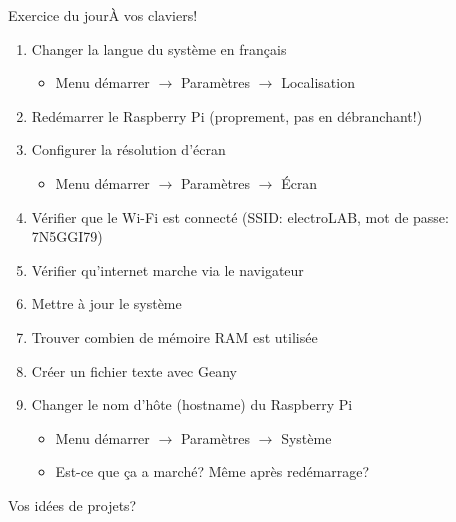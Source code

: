 \documentclass[
aspectratio=169 %
]{beamer}
\begin{document}
\begin{frame}{Exercice du jour}{À vos claviers!}
  \begin{enumerate}
    \item  Changer la langue du système en français
          \begin{itemize}
            \item Menu démarrer \(\rightarrow\) Paramètres \(\rightarrow\)
                  Localisation
          \end{itemize}
    \item Redémarrer le Raspberry Pi (proprement, pas en débranchant!)
    \item Configurer la résolution d'écran
          \begin{itemize}
            \item Menu démarrer \(\rightarrow\) Paramètres \(\rightarrow\)
                  Écran
          \end{itemize}
    \item Vérifier que le Wi-Fi est connecté (SSID: electroLAB, mot de passe:
          7N5GGI79)
    \item Vérifier qu'internet marche via le navigateur
    \item Mettre à jour le système
    \item Trouver combien de mémoire RAM est utilisée
    \item Créer un fichier texte avec Geany
    \item Changer le nom d'hôte (hostname) du Raspberry Pi
          \begin{itemize}
            \item Menu démarrer \(\rightarrow\) Paramètres \(\rightarrow\)
                  Système
            \item Est-ce que ça a marché?
                  Même après redémarrage?
          \end{itemize}

  \end{enumerate}

\end{frame}

\begin{frame}{\strut}
  \centering \alert{\huge Vos idées de projets?}
\end{frame}
\end{document}
